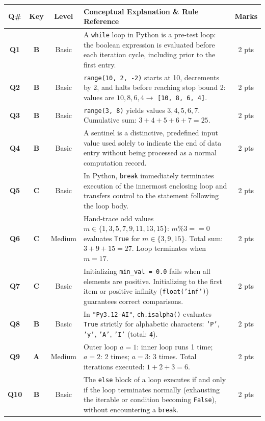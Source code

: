 \documentclass[11pt,a4paper]{article}
\begin{document}
\begin{center}
\renewcommand{\arraystretch}{1.10}
\setlength{\tabcolsep}{3.5pt}
\begin{tabularx}{\textwidth}{|c|c|c|X|c|}
\hline
\textbf{Q\#} & \textbf{Key} & \textbf{Level} & \textbf{Conceptual Explanation \& Rule Reference} & \textbf{Marks} \\
\hline
\textbf{Q1} & \textbf{B} & Basic & A \texttt{while} loop in Python is a pre-test loop: the boolean expression is evaluated before each iteration cycle, including prior to the first entry. & 2 pts \\
\hline
\textbf{Q2} & \textbf{B} & Basic & \texttt{range(10, 2, -2)} starts at 10, decrements by 2, and halts before reaching stop bound 2: values are $10, 8, 6, 4 \rightarrow$ \texttt{[10, 8, 6, 4]}. & 2 pts \\
\hline
\textbf{Q3} & \textbf{B} & Basic & \texttt{range(3, 8)} yields values $3, 4, 5, 6, 7$. Cumulative sum: $3 + 4 + 5 + 6 + 7 = 25$. & 2 pts \\
\hline
\textbf{Q4} & \textbf{B} & Basic & A sentinel is a distinctive, predefined input value used solely to indicate the end of data entry without being processed as a normal computation record. & 2 pts \\
\hline
\textbf{Q5} & \textbf{C} & Basic & In Python, \texttt{break} immediately terminates execution of the innermost enclosing loop and transfers control to the statement following the loop body. & 2 pts \\
\hline
\textbf{Q6} & \textbf{C} & Medium & Hand-trace odd values $m \in \{1, 3, 5, 7, 9, 11, 13, 15\}$: $m \% 3 == 0$ evaluates \texttt{True} for $m \in \{3, 9, 15\}$. Total sum: $3 + 9 + 15 = 27$. Loop terminates when $m = 17$. & 2 pts \\
\hline
\textbf{Q7} & \textbf{C} & Basic & Initializing \texttt{min\_val = 0.0} fails when all elements are positive. Initializing to the first item or positive infinity (\texttt{float('inf')}) guarantees correct comparisons. & 2 pts \\
\hline
\textbf{Q8} & \textbf{B} & Basic & In \texttt{"Py3.12-AI"}, \texttt{ch.isalpha()} evaluates \texttt{True} strictly for alphabetic characters: \texttt{'P'}, \texttt{'y'}, \texttt{'A'}, \texttt{'I'} (total: \texttt{4}). & 2 pts \\
\hline
\textbf{Q9} & \textbf{A} & Medium & Outer loop $a=1$: inner loop runs 1 time; $a=2$: 2 times; $a=3$: 3 times. Total iterations executed: $1 + 2 + 3 = 6$. & 2 pts \\
\hline
\textbf{Q10} & \textbf{B} & Basic & The \texttt{else} block of a loop executes if and only if the loop terminates normally (exhausting the iterable or condition becoming \texttt{False}), without encountering a \texttt{break}. & 2 pts \\
\hline
\end{tabularx}
\end{center}
\end{document}

